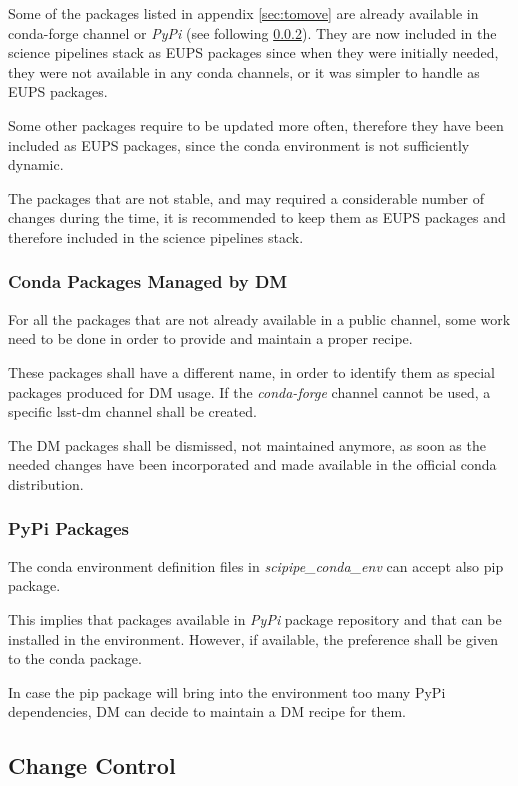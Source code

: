 Some of the packages listed in appendix \ref{sec:tomove} are already available in conda-forge channel or \textit{PyPi} (see following \ref{sec:pypi}).
They are now included in the science pipelines stack as EUPS packages since when they were initially needed, they were not available in any conda channels, or it was simpler to handle as EUPS packages.

Some other packages require to be updated more often, therefore they have been included as EUPS packages, since the conda environment is not sufficiently dynamic.

The packages that are not stable, and may required a considerable number of changes during the time, it is recommended to keep them as EUPS packages and therefore included in the science pipelines stack.


\subsubsection{Conda Packages Managed by DM} \label{sec:3rddmpkgs}

For all the packages that are not already available in a public channel, some work need to be done in order to provide and maintain a proper recipe.

These packages shall have a different name, in order to identify them as special packages produced for DM usage.
If the \textit{conda-forge} channel cannot be used, a specific lsst-dm channel shall be created.

The DM packages shall be dismissed, not maintained anymore, as soon as the needed changes have been incorporated and made available in the official conda distribution.


\subsubsection{PyPi Packages} \label{sec:pypi}

The conda environment definition files in \textit{scipipe\_conda\_env} can accept also pip package. 

This implies that packages available in \textit{PyPi} package repository and that can be installed in the environment. 
However, if available, the preference shall be given to the conda package.

In case the pip package will bring into the environment too many PyPi dependencies, DM can decide to maintain a DM recipe for them.


\subsection{Change Control}

